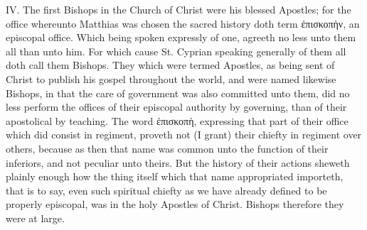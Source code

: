 IV. The first Bishops in the Church of Christ were his blessed Apostles; for the office whereunto Matthias was chosen the sacred history doth term ἐπισκοπὴν, an episcopal office. Which being spoken expressly of one, agreeth no less unto them all than unto him. For which cause St. Cyprian speaking generally of them all doth call them Bishops. They which were termed Apostles, as being sent of Christ to publish his gospel throughout the world, and were named likewise Bishops, in that the care of government was also committed unto them, did no less perform the offices of their episcopal authority by governing, than of their apostolical by teaching. The word ἐπισκοπὴ, expressing that part of their office which did consist in regiment, proveth not (I grant) their chiefty in regiment over others, because as then that name was common unto the function of their inferiors, and not peculiar unto theirs. But the history of their actions sheweth plainly enough how the thing itself which that name appropriated importeth, that is to say, even such spiritual chiefty as we have already defined to be properly episcopal, was in the holy Apostles of Christ. Bishops therefore they were at large.

